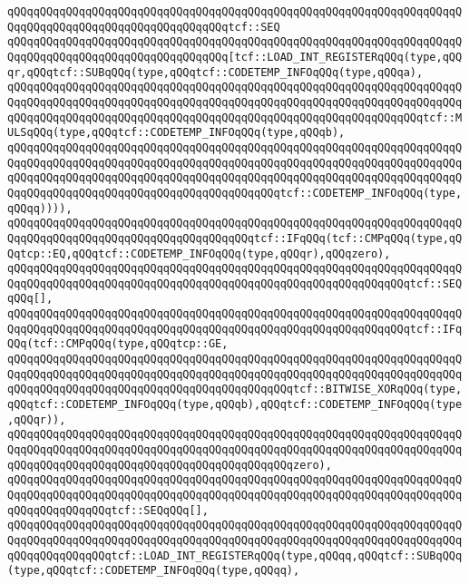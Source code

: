\verb|qQQqqQQqqQQqqQQqqQQqqQQqqQQqqQQqqQQqqQQqqQQqqQQqqQQqqQQqqQQqqQQqqQQqqQQqqQQqqQQqqQQqqQQqqQQqqQQqqQQqqQQqtcf::SEQ|\newline
\verb|qQQqqQQqqQQqqQQqqQQqqQQqqQQqqQQqqQQqqQQqqQQqqQQqqQQqqQQqqQQqqQQqqQQqqQQqqQQqqQQqqQQqqQQqqQQqqQQqqQQqqQQq[tcf::LOAD_INT_REGISTERqQQq(type,qQQqr,qQQqtcf::SUBqQQq(type,qQQqtcf::CODETEMP_INFOqQQq(type,qQQqa),|\newline
\verb|qQQqqQQqqQQqqQQqqQQqqQQqqQQqqQQqqQQqqQQqqQQqqQQqqQQqqQQqqQQqqQQqqQQqqQQqqQQqqQQqqQQqqQQqqQQqqQQqqQQqqQQqqQQqqQQqqQQqqQQqqQQqqQQqqQQqqQQqqQQqqQQqqQQqqQQqqQQqqQQqqQQqqQQqqQQqqQQqqQQqqQQqqQQqqQQqqQQqqQQqqQQqtcf::MULSqQQq(type,qQQqtcf::CODETEMP_INFOqQQq(type,qQQqb),|\newline
\verb|qQQqqQQqqQQqqQQqqQQqqQQqqQQqqQQqqQQqqQQqqQQqqQQqqQQqqQQqqQQqqQQqqQQqqQQqqQQqqQQqqQQqqQQqqQQqqQQqqQQqqQQqqQQqqQQqqQQqqQQqqQQqqQQqqQQqqQQqqQQqqQQqqQQqqQQqqQQqqQQqqQQqqQQqqQQqqQQqqQQqqQQqqQQqqQQqqQQqqQQqqQQqqQQqqQQqqQQqqQQqqQQqqQQqqQQqqQQqqQQqqQQqqQQqqQQqtcf::CODETEMP_INFOqQQq(type,qQQqq)))),|\newline
\verb|qQQqqQQqqQQqqQQqqQQqqQQqqQQqqQQqqQQqqQQqqQQqqQQqqQQqqQQqqQQqqQQqqQQqqQQqqQQqqQQqqQQqqQQqqQQqqQQqqQQqqQQqqQQqtcf::IFqQQq(tcf::CMPqQQq(type,qQQqtcp::EQ,qQQqtcf::CODETEMP_INFOqQQq(type,qQQqr),qQQqzero),|\newline
\verb|qQQqqQQqqQQqqQQqqQQqqQQqqQQqqQQqqQQqqQQqqQQqqQQqqQQqqQQqqQQqqQQqqQQqqQQqqQQqqQQqqQQqqQQqqQQqqQQqqQQqqQQqqQQqqQQqqQQqqQQqqQQqqQQqqQQqtcf::SEQqQQq[],|\newline
\verb|qQQqqQQqqQQqqQQqqQQqqQQqqQQqqQQqqQQqqQQqqQQqqQQqqQQqqQQqqQQqqQQqqQQqqQQqqQQqqQQqqQQqqQQqqQQqqQQqqQQqqQQqqQQqqQQqqQQqqQQqqQQqqQQqqQQqtcf::IFqQQq(tcf::CMPqQQq(type,qQQqtcp::GE,|\newline
\verb|qQQqqQQqqQQqqQQqqQQqqQQqqQQqqQQqqQQqqQQqqQQqqQQqqQQqqQQqqQQqqQQqqQQqqQQqqQQqqQQqqQQqqQQqqQQqqQQqqQQqqQQqqQQqqQQqqQQqqQQqqQQqqQQqqQQqqQQqqQQqqQQqqQQqqQQqqQQqqQQqqQQqqQQqqQQqqQQqqQQqqQQqtcf::BITWISE_XORqQQq(type,qQQqtcf::CODETEMP_INFOqQQq(type,qQQqb),qQQqtcf::CODETEMP_INFOqQQq(type,qQQqr)),|\newline
\verb|qQQqqQQqqQQqqQQqqQQqqQQqqQQqqQQqqQQqqQQqqQQqqQQqqQQqqQQqqQQqqQQqqQQqqQQqqQQqqQQqqQQqqQQqqQQqqQQqqQQqqQQqqQQqqQQqqQQqqQQqqQQqqQQqqQQqqQQqqQQqqQQqqQQqqQQqqQQqqQQqqQQqqQQqqQQqqQQqqQQqqQQqzero),|\newline
\verb|qQQqqQQqqQQqqQQqqQQqqQQqqQQqqQQqqQQqqQQqqQQqqQQqqQQqqQQqqQQqqQQqqQQqqQQqqQQqqQQqqQQqqQQqqQQqqQQqqQQqqQQqqQQqqQQqqQQqqQQqqQQqqQQqqQQqqQQqqQQqqQQqqQQqqQQqqQQqtcf::SEQqQQq[],|\newline
\verb|qQQqqQQqqQQqqQQqqQQqqQQqqQQqqQQqqQQqqQQqqQQqqQQqqQQqqQQqqQQqqQQqqQQqqQQqqQQqqQQqqQQqqQQqqQQqqQQqqQQqqQQqqQQqqQQqqQQqqQQqqQQqqQQqqQQqqQQqqQQqqQQqqQQqqQQqqQQqtcf::LOAD_INT_REGISTERqQQq(type,qQQqq,qQQqtcf::SUBqQQq(type,qQQqtcf::CODETEMP_INFOqQQq(type,qQQqq),|\newline
